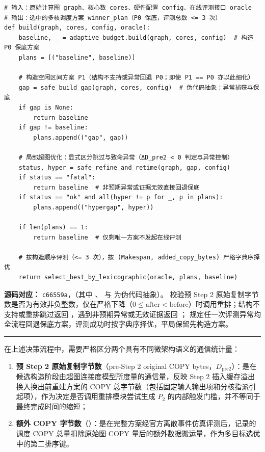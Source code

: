 \documentclass[anonymous,withtoc]{gmcm2026}
\providecommand{\tightlist}{\setlength{\itemsep}{0pt}\setlength{\parskip}{0pt}}
\begin{document}
\begin{lstlisting}[style=paperpseudo]
# 输入：原始计算图 graph、核心数 cores、硬件配置 config、在线评测接口 oracle
# 输出：选中的多核调度方案 winner_plan（P0 保底，评测总数 <= 3 次）
def build(graph, cores, config, oracle):
    baseline, _ = adaptive_budget.build(graph, cores, config)  # 构造 P0 保底方案
    plans = [("baseline", baseline)]

    # 构造空闲区间方案 P1（结构不支持或异常回退 P0；即使 P1 == P0 亦以此细化）
    gap = safe_build_gap(graph, cores, config)  # 伪代码抽象：异常捕获与保底
    if gap is None:
        return baseline
    if gap != baseline:
        plans.append(("gap", gap))

    # 局部超图优化：显式区分跳过与致命异常（ΔD_pre2 < 0 判定与异常控制）
    status, hyper = safe_refine_and_retime(graph, gap, config)
    if status == "fatal":
        return baseline  # 非预期异常或证据无效直接回退保底
    if status == "ok" and all(hyper != p for _, p in plans):
        plans.append(("hypergap", hyper))

    if len(plans) == 1:
        return baseline  # 仅剩唯一方案不发起在线评测

    # 按构造顺序评测（<= 3 次），按 (Makespan, added_copy_bytes) 严格字典序择优
    return select_best_by_lexicographic(oracle, plans, baseline)
\end{lstlisting}
\textbf{源码对应：} \texttt{c66559a}，\texttt{}（其中 \texttt{}、\texttt{} 与 \texttt{} 为伪代码抽象）。\texttt{} 校验预 Step 2 原始复制字节数是否为有效非负整数，仅在严格下降（\(0 \le \text{after} < \text{before}\)）时调用重排；结构不支持或重排跳过返回 \texttt{}，遇到非预期异常或无效证据返回 \texttt{}；\texttt{} 规定任一次评测异常均全流程回退保底方案，评测成功时按字典序择优，平局保留先构造方案。

\par\hrule\endgroup

在上述决策流程中，需要严格区分两个具有不同微架构语义的通信统计量：

\begin{enumerate}
\def\labelenumi{\arabic{enumi}.}
\tightlist
\item
  \textbf{预 Step 2 原始复制字节数}（pre-Step 2 original COPY bytes，\(D_{\mathrm{pre2}}\)）：是在候选构造阶段由超图连接度模型所度量的通信量，反映 Step 2 插入缓存溢出换入换出前重建方案的 COPY 总字节数（包括固定输入输出项和分核指派引起项），作为决定是否调用重排模块尝试生成 \(P_2\) 的内部触发门槛，并不等同于最终完成时间的缩短；
\item
  \textbf{额外 COPY 字节数}（\texttt{}）：是在完整方案经官方离散事件仿真评测后，记录的调度 COPY 总量扣除原始图 COPY 量后的额外数据搬运量，作为多目标选优中的第二排序键。
\end{enumerate}
\end{document}
